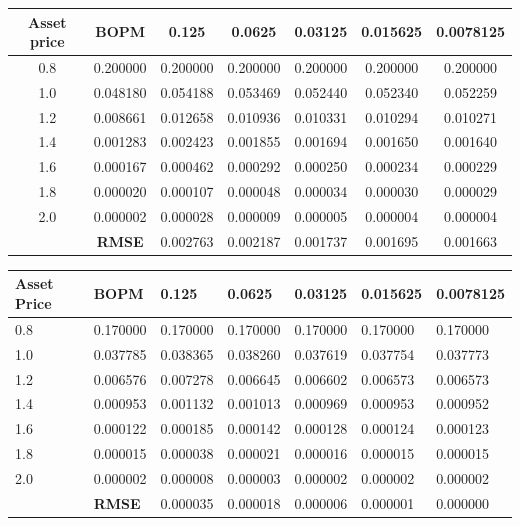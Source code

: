 \begin{table}[H]
    \begin{tabular}{@{}ccccccc@{}}
        \toprule
        \textbf{Asset price} & \textbf{BOPM} & 0.125    & 0.0625   & 0.03125  & 0.015625 & 0.0078125 \\ \midrule
        0.8                  & 0.200000      & 0.200000 & 0.200000 & 0.200000 & 0.200000 & 0.200000  \\
        1.0                  & 0.048180      & 0.054188 & 0.053469 & 0.052440 & 0.052340 & 0.052259  \\
        1.2                  & 0.008661      & 0.012658 & 0.010936 & 0.010331 & 0.010294 & 0.010271  \\
        1.4                  & 0.001283      & 0.002423 & 0.001855 & 0.001694 & 0.001650 & 0.001640  \\
        1.6                  & 0.000167      & 0.000462 & 0.000292 & 0.000250 & 0.000234 & 0.000229  \\
        1.8                  & 0.000020      & 0.000107 & 0.000048 & 0.000034 & 0.000030 & 0.000029  \\
        2.0                  & 0.000002      & 0.000028 & 0.000009 & 0.000005 & 0.000004 & 0.000004  \\
                             & \textbf{RMSE} & 0.002763 & 0.002187 & 0.001737 & 0.001695 & 0.001663  \\ \bottomrule
    \end{tabular}
\end{table}

\begin{table}[H]
    \begin{tabular}{@{}lllllll@{}}
        \toprule
        \textbf{Asset Price} & \textbf{BOPM} & 0.125    & 0.0625   & 0.03125  & 0.015625 & 0.0078125 \\ \midrule
        0.8                  & 0.170000      & 0.170000 & 0.170000 & 0.170000 & 0.170000 & 0.170000  \\
        1.0                  & 0.037785      & 0.038365 & 0.038260 & 0.037619 & 0.037754 & 0.037773  \\
        1.2                  & 0.006576      & 0.007278 & 0.006645 & 0.006602 & 0.006573 & 0.006573  \\
        1.4                  & 0.000953      & 0.001132 & 0.001013 & 0.000969 & 0.000953 & 0.000952  \\
        1.6                  & 0.000122      & 0.000185 & 0.000142 & 0.000128 & 0.000124 & 0.000123  \\
        1.8                  & 0.000015      & 0.000038 & 0.000021 & 0.000016 & 0.000015 & 0.000015  \\
        2.0                  & 0.000002      & 0.000008 & 0.000003 & 0.000002 & 0.000002 & 0.000002  \\
                             & \textbf{RMSE} & 0.000035 & 0.000018 & 0.000006 & 0.000001 & 0.000000  \\ \bottomrule
    \end{tabular}
\end{table}